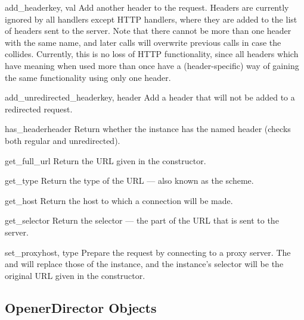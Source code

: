 \begin{methoddesc}[Request]{add_header}{key, val}
Add another header to the request.  Headers are currently ignored by
all handlers except HTTP handlers, where they are added to the list
of headers sent to the server.  Note that there cannot be more than
one header with the same name, and later calls will overwrite
previous calls in case the  collides.  Currently, this is
no loss of HTTP functionality, since all headers which have meaning
when used more than once have a (header-specific) way of gaining the
same functionality using only one header.
\end{methoddesc}

\begin{methoddesc}[Request]{add_unredirected_header}{key, header}
Add a header that will not be added to a redirected request.
\end{methoddesc}

\begin{methoddesc}[Request]{has_header}{header}
Return whether the instance has the named header (checks both regular
and unredirected).
\end{methoddesc}

\begin{methoddesc}[Request]{get_full_url}{}
Return the URL given in the constructor.
\end{methoddesc}

\begin{methoddesc}[Request]{get_type}{}
Return the type of the URL --- also known as the scheme.
\end{methoddesc}

\begin{methoddesc}[Request]{get_host}{}
Return the host to which a connection will be made.
\end{methoddesc}

\begin{methoddesc}[Request]{get_selector}{}
Return the selector --- the part of the URL that is sent to
the server.
\end{methoddesc}

\begin{methoddesc}[Request]{set_proxy}{host, type}
Prepare the request by connecting to a proxy server. The 
and  will replace those of the instance, and the instance's
selector will be the original URL given in the constructor.
\end{methoddesc}


\subsection{OpenerDirector Objects \label{opener-director-objects}}

